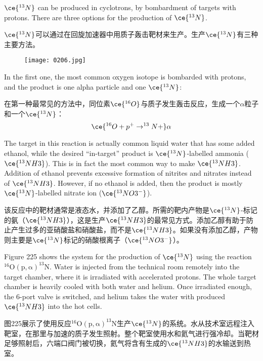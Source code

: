 \documentclass[dvipsnames, svgnames,a4paper,11pt]{article}
\begin{document}
\(\ce{^{13}N}\) can be produced in cyclotrons, by bombardment of targets with protons. There are three options for the production of \(\ce{^{13}N}\).  

\(\ce{^{13}N}\)可以通过在回旋加速器中用质子轰击靶材来生产。生产\(\ce{^{13}N}\)有三种主要方法。

\begin{figure}[h]
	\centering
    \texttt{[image: 0206.jpg]}  
     \label{fig255}
\end{figure}

In the first one, the most common oxygen isotope is bombarded with protons, and the product is one alpha particle and one \(\ce{^{13}N}\):

在第一种最常见的方法中，同位素\(\ce{^{16}O}\)与质子发生轰击反应，生成一个$\alpha$粒子和一个\(\ce{^{13}N}\)：
\[
\ce{^{16}O + p^+ \to ^{13}N + }\alpha
\]

The target in this reaction is actually common liquid water that has some added ethanol, while the desired “in-target” product is \(\ce{^{13}N}\)-labelled ammonia (\(\ce{^{13}NH3}\)). This is in fact the most common way to make \(\ce{^{13}NH3}\). Addition of ethanol prevents excessive formation of nitrites and nitrates instead of \(\ce{^{13}NH3}\). However, if no ethanol is added, then the product is mostly \(\ce{^{13}N}\)-labelled nitrate ion (\(\ce{^{13}NO3^{-}}\)).

该反应中的靶材通常是液态水，并添加了乙醇。所需的靶内产物是\(\ce{^{13}N}\)-标记的氨（\(\ce{^{13}NH3}\)），这是生产\(\ce{^{13}NH3}\)的最常见方式。添加乙醇有助于防止产生过多的亚硝酸盐和硝酸盐，而不是\(\ce{^{13}NH3}\)。如果没有添加乙醇，产物则主要是\(\ce{^{13}N}\)标记的硝酸根离子（\(\ce{^{13}NO3^-}\)）。


Figure 225 shows the system for the production of \(\ce{^{13}N}\) using the reaction \(\mathrm{^{16}O(p,\alpha)^{13}N}\). Water is injected from the technical room remotely into the target chamber, where it is irradiated with accelerated protons. The whole target chamber is heavily cooled with both water and helium. Once irradiated enough, the 6-port valve is switched, and helium takes the water with produced \(\ce{^{13}NH3}\) into the hot cells.

图225展示了使用反应\(\mathrm{^{16}O(p, \alpha)^{13}N}\)生产\(\ce{^{13}N}\)的系统。水从技术室远程注入靶室，在那里与加速的质子发生照射。整个靶室使用水和氦气进行强冷却。当靶材足够照射后，六端口阀门被切换，氦气将含有生成的\(\ce{^{13}NH3}\)的水输送到热室。
\end{document}
